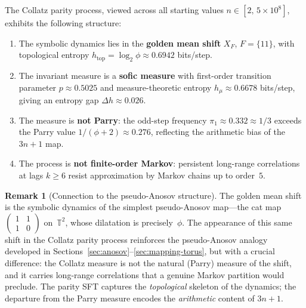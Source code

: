 \documentclass[11pt,a4paper]{article}
\newcommand{\T}{\mathbb{T}}
\theoremstyle{plain}
\theoremstyle{definition}
\newtheorem{remark}[theorem]{Remark}
\begin{document}
\begin{mainresult}
    The Collatz parity process, viewed across all starting values
    $n \in [2,\, 5 \times 10^8]$, exhibits the following structure:
    \begin{enumerate}[label=(\roman*)]
        \item The symbolic dynamics lies in the \textbf{golden mean
        shift} $X_F$, $F = \{11\}$, with topological entropy
        $h_{\mathrm{top}} = \log_2 \phi \approx 0.6942$
        bits/step.

        \item The invariant measure is a \textbf{sofic measure}
        with first-order transition parameter $p \approx 0.5025$
        and measure-theoretic entropy
        $h_\mu \approx 0.6678$ bits/step, giving an entropy gap
        $\Delta h \approx 0.026$.

        \item The measure is \textbf{not Parry}: the odd-step
        frequency $\pi_1 \approx 0.332 \approx 1/3$ exceeds the
        Parry value $1/(\phi + 2) \approx 0.276$, reflecting the
        arithmetic bias of the $3n{+}1$ map.

        \item The process is \textbf{not finite-order Markov}:
        persistent long-range correlations at lags $k \geq 6$
        resist approximation by Markov chains up to order~$5$.
    \end{enumerate}
\end{mainresult}

\begin{remark}[Connection to the pseudo-Anosov structure]
    The golden mean shift is the symbolic dynamics of the simplest
    pseudo-Anosov map---the cat map
    $\left(\begin{smallmatrix} 1 & 1 \\ 1 & 0
    \end{smallmatrix}\right)$ on~$\T^2$, whose dilatation is
    precisely~$\phi$.  The appearance of this same shift in the
    Collatz parity process reinforces the pseudo-Anosov analogy
    developed in
    Sections~\ref{sec:anosov}--\ref{sec:mapping-torus}, but with
    a crucial difference: the Collatz measure is not the natural
    (Parry) measure of the shift, and it carries long-range
    correlations that a genuine Markov partition would preclude.
    The parity SFT captures the \emph{topological} skeleton of the
    dynamics; the departure from the Parry measure encodes the
    \emph{arithmetic} content of $3n{+}1$.
\end{remark}
\end{document}
